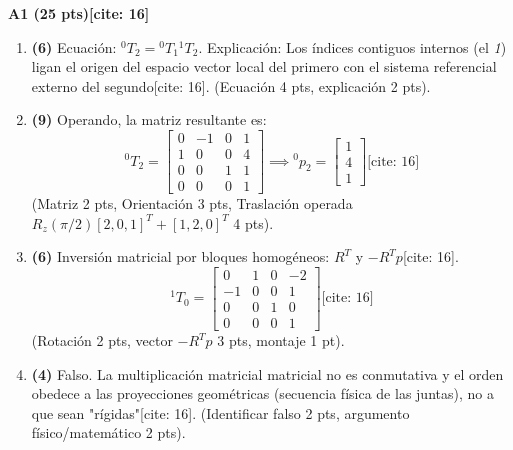 \documentclass[11pt, a4paper]{article}
\begin{document}
\textbf{A1 (25 pts)[cite: 16]}
\begin{enumerate}\footnotesize
    \item \textbf{(6)} Ecuación: ${}^0T_2 = {}^0T_1 {}^1T_2$. Explicación: Los índices contiguos internos (el \textit{1}) ligan el origen del espacio vector local del primero con el sistema referencial externo del segundo[cite: 16]. (Ecuación 4 pts, explicación 2 pts).
    \item \textbf{(9)} Operando, la matriz resultante es:
    \begin{equation*}
        {}^0T_2 = \begin{bmatrix} 0 & -1 & 0 & 1 \\ 1 & 0 & 0 & 4 \\ 0 & 0 & 1 & 1 \\ 0 & 0 & 0 & 1 \end{bmatrix} \implies {}^0p_2 = \begin{bmatrix} 1 \\ 4 \\ 1 \end{bmatrix} \text{[cite: 16]}
    \end{equation*}
    (Matriz 2 pts, Orientación 3 pts, Traslación operada $R_z(\pi/2)[2,0,1]^T + [1,2,0]^T$ 4 pts).
    \item \textbf{(6)} Inversión matricial por bloques homogéneos: $R^T$ y $-R^T p$[cite: 16].
    \begin{equation*}
        {}^1T_0 = \begin{bmatrix} 0 & 1 & 0 & -2 \\ -1 & 0 & 0 & 1 \\ 0 & 0 & 1 & 0 \\ 0 & 0 & 0 & 1 \end{bmatrix} \text{[cite: 16]}
    \end{equation*}
    (Rotación 2 pts, vector $-R^Tp$ 3 pts, montaje 1 pt).
    \item \textbf{(4)} Falso. La multiplicación matricial matricial no es conmutativa y el orden obedece a las proyecciones geométricas (secuencia física de las juntas), no a que sean "rígidas"[cite: 16]. (Identificar falso 2 pts, argumento físico/matemático 2 pts).
\end{enumerate}
\end{document}
